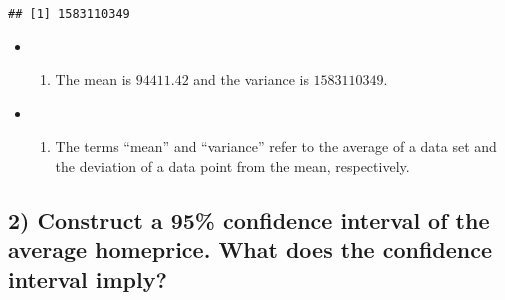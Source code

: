 \documentclass[
  12pt,
]{article}
\newenvironment{Shaded}{\begin{snugshade}}{\end{snugshade}}
\newcommand{\CommentTok}[1]{\textcolor[rgb]{0.56,0.35,0.01}{\textit{#1}}}
\newcommand{\DecValTok}[1]{\textcolor[rgb]{0.00,0.00,0.81}{#1}}
\newcommand{\FunctionTok}[1]{\textcolor[rgb]{0.00,0.00,0.00}{#1}}
\newcommand{\NormalTok}[1]{#1}
\newcommand{\OtherTok}[1]{\textcolor[rgb]{0.56,0.35,0.01}{#1}}
\newcommand{\SpecialCharTok}[1]{\textcolor[rgb]{0.00,0.00,0.00}{#1}}
\providecommand{\tightlist}{%
  \setlength{\itemsep}{0pt}\setlength{\parskip}{0pt}}
\begin{document}
\begin{Shaded}
\end{Shaded}

\begin{verbatim}
## [1] 1583110349
\end{verbatim}

\begin{itemize}
\item
  \begin{enumerate}
  \def\labelenumi{\alph{enumi})}
  \tightlist
  \item
    The mean is \(94411.42\) and the variance is \(1583110349\).\\
  \end{enumerate}
\item
  \begin{enumerate}
  \def\labelenumi{\alph{enumi})}
  \setcounter{enumi}{1}
  \tightlist
  \item
    The terms ``mean'' and ``variance'' refer to the average of a data
    set and the deviation of a data point from the mean, respectively.\\
  \end{enumerate}
\end{itemize}

\hypertarget{construct-a-95-confidence-interval-of-the-average-homeprice.-what-does-the-confidence-interval-imply}{%
\subsection{2) Construct a 95\% confidence interval of the average
homeprice. What does the confidence interval
imply?}\label{construct-a-95-confidence-interval-of-the-average-homeprice.-what-does-the-confidence-interval-imply}}

\begin{Shaded}
\end{Shaded}
\end{document}

